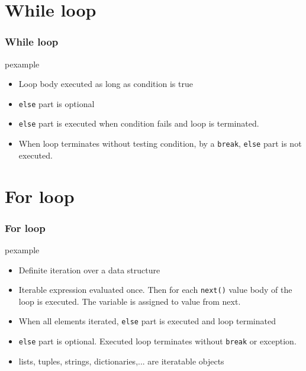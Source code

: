 \documentclass[trans,compress,xcolor=table]{beamer}
\begin{document}
\section{While loop}

\begin{frame}
\frametitle{While loop}
\begin{beamercolorbox}{pexample}
\codewhile
\end{beamercolorbox}
\begin{itemize}
\item Loop body executed as long as condition is true
 \item \lstinline!else! part is optional
\item \lstinline!else! part is
 executed when condition fails and loop is terminated.
\item When loop terminates without testing condition, by a \lstinline!break!,
	\lstinline!else! part is not executed.
\end{itemize}
\end{frame}
\section{For loop}

\begin{frame}
\frametitle{For loop}
\begin{beamercolorbox}{pexample}
\codefor
\end{beamercolorbox}
\begin{itemize}
\item Definite iteration over  a data structure
\item Iterable expression evaluated once. Then for each \lstinline!next()! value
     body of the loop is executed. The variable is assigned to value from next.
\item When all elements iterated, \lstinline!else! part is
 executed and loop terminated
 \item \lstinline!else! part is optional. Executed loop terminates without \lstinline!break! or exception.
 \item lists, tuples, strings, dictionaries,... are iteratable objects
\end{itemize}
\end{frame}
\end{document}
